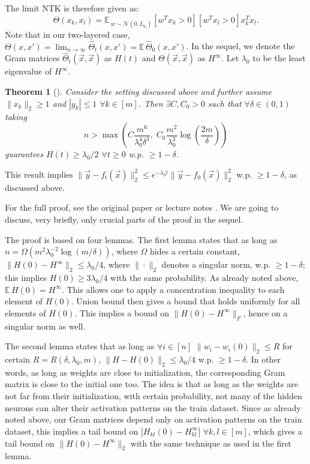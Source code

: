 \documentclass{article}
\newcommand{\EE}{\mathbb{E}\,}
\newcommand{\NN}{\mathcal{N}}
\newtheorem{theorem}{Theorem}
\begin{document}
    The limit NTK is therefore given as:
    \begin{equation}
        \Theta(x_k, x_l) =
        \EE_{w \sim \NN(0, I_{n_0})} [w^T x_k > 0] [w^T x_l > 0] x_k^T x_l.
    \end{equation}
    Note that in our two-layered case, $\Theta(x,x') = \lim_{n \to \infty} \hat\Theta_t(x,x') = \EE \hat\Theta_0(x,x')$.
    In the sequel, we denote the Gram matrices $\hat\Theta_t(\vec x, \vec x)$ as $H(t)$ and $\Theta(\vec x, \vec x)$ as $H^\infty$.
    Let $\lambda_0$ to be the least eigenvalue of $H^\infty$.

    \begin{theorem}[\cite{du2018gradient}]
        Consider the setting discussed above and further assume $\|x_k\|_2 \geq 1$ and $|y_k| \leq 1$ $\forall k \in [m]$.
        Then $\exists C, C_0 > 0$ such that $\forall \delta \in (0,1)$ taking
        \begin{equation}
            n >
            \max\left(
                C \frac{m^6}{\lambda_0^4 \delta^3}, \;
                C_0 \frac{m^2}{\lambda_0^2} \log\left(\frac{2m}{\delta}\right)
            \right)
        \end{equation}
        guarantees $H(t) \geq \lambda_0/2$ $\forall t \geq 0$ w.p. $\geq 1-\delta$.
        \label{thm:convergence_2layer}
    \end{theorem}
    This result implies $\| \vec y - f_t(\vec x) \|_2^2 \leq e^{-\lambda_0 t} \| \vec y - f_0(\vec x) \|_2^2$ w.p. $\geq 1-\delta$, as discussed above.
    
    For the full proof, see the original paper \cite{du2018gradient} or lecture notes \cite{golikov2020notes}.
    We are going to discuss, very briefly, only crucial parts of the proof in the sequel.

    The proof is based on four lemmas.
    The first lemma states that as long as $n = \Omega(m^2 \lambda_0^{-2} \log(m/\delta))$, where $\Omega$ hides a certain constant, $\|H(0) - H^\infty\|_2 \leq \lambda_0/4$, where $\|\cdot\|_2$ denotes a singular norm, w.p. $\geq 1-\delta$; this implies $H(0) \geq 3\lambda_0/4$ with the same probability.
    As already noted above, $\EE H(0) = H^\infty$.
    This allows one to apply a concentration inequality to each element of $H(0)$.
    Union bound then gives a bound that holds uniformly for all elements of $H(0)$.
    This implies a bound on $\|H(0) - H^\infty\|_F$, hence on a singular norm as well.

    The second lemma states that as long as $\forall i \in [n]$ $\|w_i - w_i(0)\|_2 \leq R$ for certain $R = R(\delta,\lambda_0,m)$, $\| H - H(0) \|_2 \leq \lambda_0/4$ w.p. $\geq 1-\delta$.
    In other words, as long as weights are close to initialization, the corresponding Gram matrix is close to the initial one too.
    The idea is that as long as the weights are not far from their initialization, with certain probability, not many of the hidden neurons can alter their activation patterns on the train dataset.
    Since as already noted above, our Gram matrices depend only on activation patterns on the train dataset, this implies a tail bound on $|H_{kl}(0) - H_{kl}^\infty|$ $\forall k,l \in [m]$, which gives a tail bound on $\|H(0) - H^\infty\|_2$ with the same technique as used in the first lemma.
\end{document}
